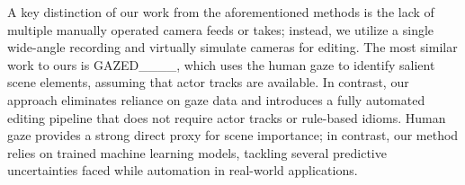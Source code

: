 A key distinction of our work from the aforementioned methods is the lack of multiple manually operated camera feeds or takes; instead, we utilize a single wide-angle recording and virtually simulate cameras for editing. 
The most similar work to ours is GAZED____, which uses the human gaze to identify salient scene elements, assuming that actor tracks are available. In contrast, our approach eliminates reliance on gaze data and introduces a fully automated editing pipeline that does not require actor tracks or rule-based idioms. Human gaze provides a strong direct proxy for scene importance; in contrast, our method relies on trained machine learning models, tackling several predictive uncertainties faced while automation in real-world applications.